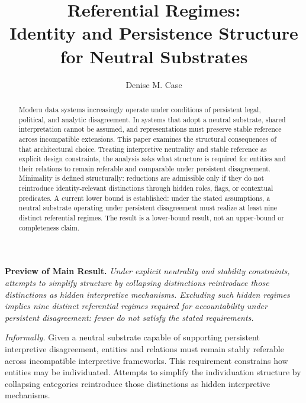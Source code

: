 \documentclass[11pt]{article}
\title{Referential Regimes:  \\
Identity and Persistence Structure \\
for Neutral Substrates}
\author{Denise M. Case}
\affil{Northwest Missouri State University, Computer Science and Information Systems, Maryville, MO, USA}
\date{} %
\theoremstyle{plain}
\theoremstyle{definition}
\theoremstyle{remark}
\begin{document}
\maketitle
\vspace{-1em}

\begin{abstract}
Modern data systems increasingly operate under conditions of persistent
legal, political, and analytic disagreement.
In systems that adopt a neutral substrate, shared interpretation cannot
be assumed, and representations must preserve stable reference across
incompatible extensions.
This paper examines the structural consequences of that architectural choice.
Treating interpretive neutrality and stable reference as explicit
design constraints, the analysis asks what
structure is required for entities and their relations to remain
referable and comparable under persistent disagreement.
Minimality is defined structurally:
reductions are admissible only if they do not
reintroduce identity-relevant distinctions
through hidden roles, flags, or contextual predicates.
A current lower bound is established: under the stated assumptions,
a neutral substrate operating under persistent disagreement must realize
at least nine distinct referential regimes.
The result is a lower-bound result, not an upper-bound or completeness claim.
\end{abstract}


\bigskip
\noindent\textbf{Preview of Main Result.}
\emph{Under explicit neutrality and stability constraints, attempts to
  simplify structure by collapsing distinctions reintroduce
  those distinctions as hidden interpretive mechanisms.
  Excluding such hidden regimes implies
  nine distinct referential regimes
  required for accountability under persistent disagreement:
  fewer do not satisfy the stated requirements.}

\medskip
\noindent
\emph{Informally.}
Given a neutral substrate capable of supporting persistent
interpretive disagreement, entities and relations
must remain stably referable across incompatible interpretive frameworks.
This requirement constrains how entities may be individuated.
Attempts to simplify the individuation structure by collapsing
categories reintroduce those distinctions as hidden interpretive
mechanisms.
\end{document}

